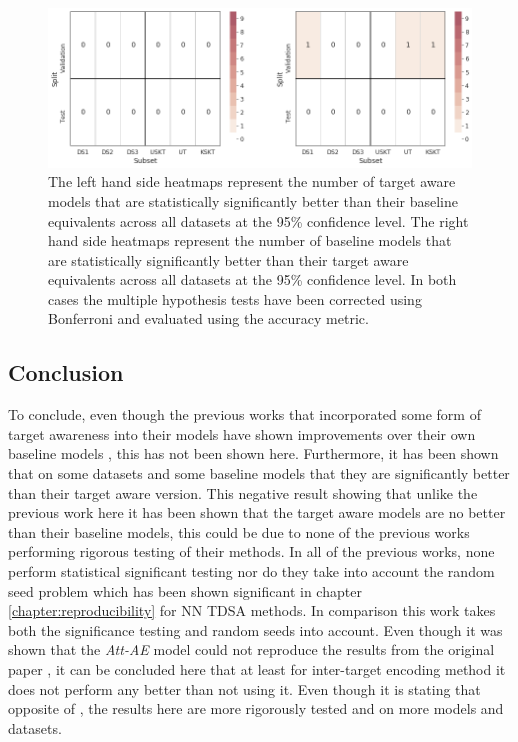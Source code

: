 \begin{figure}[!h]
    \centering
    \includegraphics[scale=0.5]{images/augmentation/methods_performance/Inter_Target/inter_target_split_combined_heatmap.png}
    \caption{The left hand side heatmaps represent the number of target aware models that are statistically significantly better than their baseline equivalents across all datasets at the 95\% confidence level. The right hand side heatmaps represent the number of baseline models that are statistically significantly better than their target aware equivalents across all datasets at the 95\% confidence level. In both cases the multiple hypothesis tests have been corrected using Bonferroni and evaluated using the accuracy metric.}
    \label{fig:aug_inter_target_split_combined_heatmap}
\end{figure}

\FloatBarrier
\subsection{Conclusion}
To conclude, even though the previous works that incorporated some form of target awareness into their models have shown improvements over their own baseline models \citep{zhao2019modeling, fan-etal-2018-multi}, this has not been shown here. Furthermore, it has been shown that on some datasets and some baseline models that they are significantly better than their target aware version. This negative result showing that unlike the previous work here it has been shown that the target aware models are no better than their baseline models, this could be due to none of the previous works performing rigorous testing of their methods. In all of the previous works, none perform statistical significant testing nor do they take into account the random seed problem \citep{reimers-gurevych-2017-reporting} which has been shown significant in chapter \ref{chapter:reproducibility} for NN TDSA methods. In comparison this work takes both the significance testing and random seeds into account. Even though it was shown that the \textit{Att-AE} model could not reproduce the results from the original paper \citep{hazarika-etal-2018-modeling}, it can be concluded here that at least for \citet{hazarika-etal-2018-modeling} inter-target encoding method it does not perform any better than not using it. Even though it is stating that opposite of  \citet{hazarika-etal-2018-modeling}, the results here are more rigorously tested and on more models and datasets.


